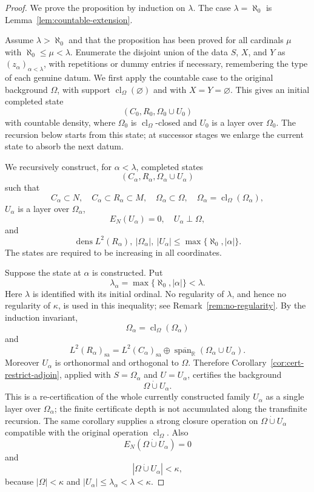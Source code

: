 \documentclass[11pt,letterpaper,reqno]{amsart}
\theoremstyle{definition}
\numberwithin{equation}{section}
\newcommand{\sa}{\mathrm{sa}}
\newcommand{\RR}{\mathbb R}
\newcommand{\cl}{\operatorname{cl}}
\DeclareMathOperator{\spanop}{span}
\DeclareMathOperator{\dens}{dens}
\begin{document}
\begin{proof}
We prove the proposition by induction on $\lambda$.  The case $\lambda=\aleph_0$ is Lemma~\ref{lem:countable-extension}.

Assume $\lambda>\aleph_0$ and that the proposition has been proved for all cardinals $\mu$ with $\aleph_0\leq\mu<\lambda$.  Enumerate the disjoint union of the data $S$, $X$, and $Y$ as $(z_\alpha)_{\alpha<\lambda}$, with repetitions or dummy entries if necessary, remembering the type of each genuine datum.  We first apply the countable case to the original background $\Omega$, with support $\cl_\Omega(\varnothing)$ and with $X=Y=\varnothing$.  This gives an initial completed state
\[
   (C_0,R_0,\Omega_0\cup U_0)
\]
with countable density, where $\Omega_0$ is $\cl_\Omega$-closed and $U_0$ is a layer over $\Omega_0$.  The recursion below starts from this state; at successor stages we enlarge the current state to absorb the next datum.

We recursively construct, for $\alpha<\lambda$, completed states
\[
   (C_\alpha,R_\alpha,\Omega_\alpha\cup U_\alpha)
\]
such that
\[
   C_\alpha\subset N,
   \quad C_\alpha\subset R_\alpha\subset M,
   \quad \Omega_\alpha\subset\Omega,
   \quad \Omega_\alpha=\cl_\Omega(\Omega_\alpha),
\]
$U_\alpha$ is a layer over $\Omega_\alpha$,
\[
   E_N(U_\alpha)=0,
   \quad U_\alpha\perp\Omega,
\]
and
\[
   \dens L^2(R_\alpha),\ |\Omega_\alpha|,\ |U_\alpha|
   \leq\max\{\aleph_0,|\alpha|\}.
\]
The states are required to be increasing in all coordinates.

Suppose the state at $\alpha$ is constructed.  Put
\[
   \lambda_\alpha=\max\{\aleph_0,|\alpha|\}<\lambda.
\]
Here \(\lambda\) is identified with its initial ordinal.  No regularity of
\(\lambda\), and hence no regularity of \(\kappa\), is used in this inequality;
see Remark~\ref{rem:no-regularity}.
By the induction invariant,
\[
   \Omega_\alpha=\cl_\Omega(\Omega_\alpha)
\]
and
\[
   L^2(R_\alpha)_{\sa}
   =
   L^2(C_\alpha)_{\sa}\oplus
   \overline{\spanop_{\RR}}(\Omega_\alpha\cup U_\alpha).
\]
Moreover $U_\alpha$ is orthonormal and orthogonal to $\Omega$. Therefore
Corollary~\ref{cor:cert-restrict-adjoin}, applied with
$S=\Omega_\alpha$ and $U=U_\alpha$, certifies the background
\[
   \Omega\dot\cup U_\alpha .
\]
This is a re-certification of the whole currently constructed family
\(U_\alpha\) as a single layer over \(\Omega_\alpha\); the finite certificate
depth is not accumulated along the transfinite recursion.  The same corollary
supplies a strong closure operation on
$\Omega\dot\cup U_\alpha$ compatible with the original operation
$\cl_\Omega$. Also
\[
   E_N(\Omega\dot\cup U_\alpha)=0
\]
and
\[
   |\Omega\dot\cup U_\alpha|<\kappa,
\]
because $|\Omega|<\kappa$ and
$|U_\alpha|\leq\lambda_\alpha<\lambda<\kappa$.


\end{proof}
\end{document}
